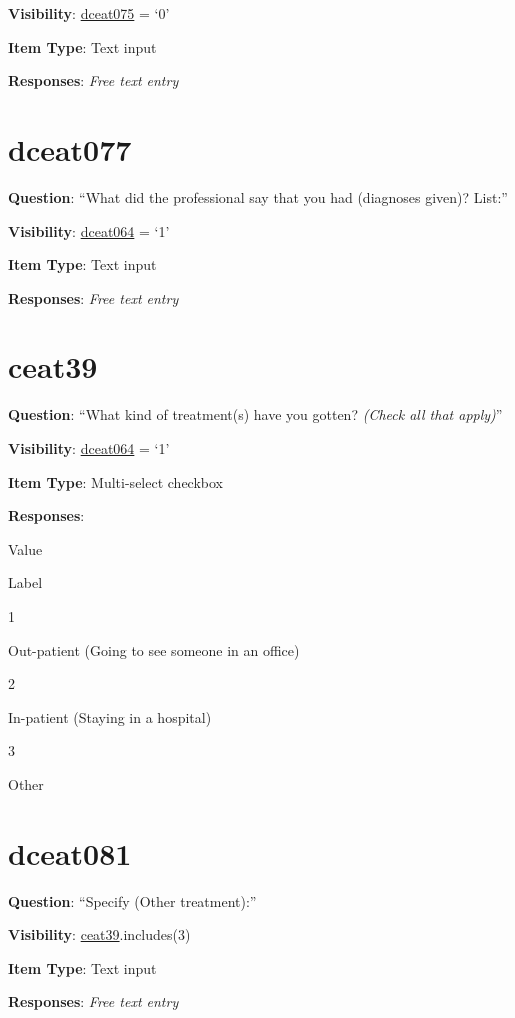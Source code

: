 \documentclass[]{book}
\begin{document}
\textbf{Visibility}: \protect\hyperlink{dceat075}{dceat075} = `0'

\textbf{Item Type}: Text input

\textbf{Responses}: \emph{Free text entry}

\hypertarget{dceat077}{%
\section{dceat077}\label{dceat077}}

\textbf{Question}: ``What did the professional say that you had (diagnoses given)? List:''

\textbf{Visibility}: \protect\hyperlink{dceat064}{dceat064} = `1'

\textbf{Item Type}: Text input

\textbf{Responses}: \emph{Free text entry}

\hypertarget{ceat39}{%
\section{ceat39}\label{ceat39}}

\textbf{Question}: ``What kind of treatment(s) have you gotten? \emph{(Check all that apply)}''

\textbf{Visibility}: \protect\hyperlink{dceat064}{dceat064} = `1'

\textbf{Item Type}: Multi-select checkbox

\textbf{Responses}:

Value

Label

1

Out-patient (Going to see someone in an office)

2

In-patient (Staying in a hospital)

3

Other

\hypertarget{dceat081}{%
\section{dceat081}\label{dceat081}}

\textbf{Question}: ``Specify (Other treatment):''

\textbf{Visibility}: \protect\hyperlink{ceat39}{ceat39}.includes(3)

\textbf{Item Type}: Text input

\textbf{Responses}: \emph{Free text entry}
\end{document}
